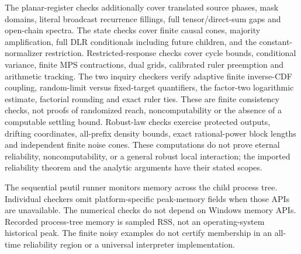 The planar-register checks additionally cover translated source phases,
mask domains, literal broadcast recurrence fillings, full tensor/direct-sum
gaps and open-chain spectra. The state checks cover finite causal cones,
majority amplification, full DLR conditionals including future children,
and the constant-normalizer restriction. Restricted-response checks cover
cycle bounds, conditional variance, finite MPS contractions, dual grids,
calibrated ruler preemption and arithmetic tracking. The two inquiry checkers verify adaptive finite inverse-CDF coupling,
random-limit versus fixed-target quantifiers, the factor-two logarithmic
estimate, factorial rounding and exact ruler ties. These are finite
consistency checks, not proofs of randomized reach, noncomputability or
the absence of a computable settling bound. Robust-law checks exercise
protected outputs, drifting coordinates, all-prefix density bounds, exact
rational-power block lengths and independent finite noise cones. These computations do not prove eternal reliability, noncomputability,
or a general robust local interaction; the imported reliability theorem and
the analytic arguments have their stated scopes.

The sequential psutil runner monitors memory across the child process tree.
Individual checkers omit platform-specific peak-memory fields when those APIs
are unavailable. The numerical checks do not depend on Windows memory APIs.
Recorded process-tree memory is sampled RSS, not an operating-system historical
peak. The finite noisy examples do not certify membership in an all-time
reliability region or a universal interpreter implementation.
